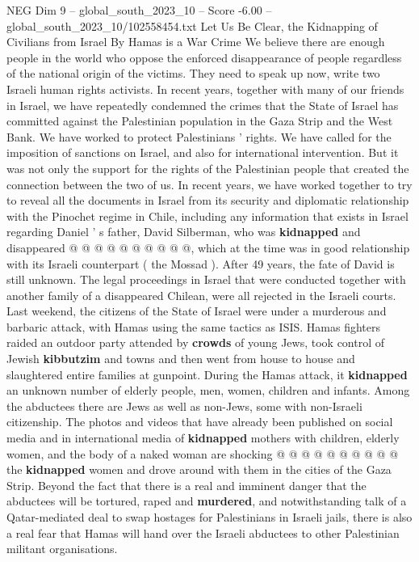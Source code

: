 \begin{textsample}{NEG Dim 9 – global\_south\_2023\_10 – Score -6.00 – global\_south\_2023\_10/102558454.txt}  \label{ex:f9_neg_363}
Let Us Be Clear, the Kidnapping of Civilians from Israel By Hamas is a War Crime We believe there are enough people in the world who oppose the enforced disappearance of people regardless of the national origin of the victims.
They need to speak up now, write two Israeli human rights activists.
In recent years, together with many of our friends in Israel, we have repeatedly condemned the crimes that the State of Israel has committed against the Palestinian population in the Gaza Strip and the West Bank.
We have worked to protect Palestinians ' rights.
We have called for the imposition of sanctions on Israel, and also for international intervention.
But it was not only the support for the rights of the Palestinian people that created the connection between the two of us.
In recent years, we have worked together to try to reveal all the documents in Israel from its security and diplomatic relationship with the Pinochet regime in Chile, including any information that exists in Israel regarding Daniel ' s father, David Silberman, who was \textbf{kidnapped} and disappeared @ @ @ @ @ @ @ @ @ @, which at the time was in good relationship with its Israeli counterpart ( the Mossad ).
After 49 years, the fate of David is still unknown.
The legal proceedings in Israel that were conducted together with another family of a disappeared Chilean, were all rejected in the Israeli courts.
Last weekend, the citizens of the State of Israel were under a murderous and barbaric attack, with Hamas using the same tactics as ISIS.
Hamas fighters raided an outdoor party attended by \textbf{crowds} of young Jews, took control of Jewish \textbf{kibbutzim} and towns and then went from house to house and slaughtered entire families at gunpoint.
During the Hamas attack, it \textbf{kidnapped} an unknown number of elderly people, men, women, children and infants.
Among the abductees there are Jews as well as non-Jews, some with non-Israeli citizenship.
The photos and videos that have already been published on social media and in international media of \textbf{kidnapped} mothers with children, elderly women, and the body of a naked woman are shocking @ @ @ @ @ @ @ @ @ @ the \textbf{kidnapped} women and drove around with them in the cities of the Gaza Strip.
Beyond the fact that there is a real and imminent danger that the abductees will be tortured, raped and \textbf{murdered}, and notwithstanding talk of a Qatar-mediated deal to swap hostages for Palestinians in Israeli jails, there is also a real fear that Hamas will hand over the Israeli abductees to other Palestinian militant organisations.

\end{textsample}
